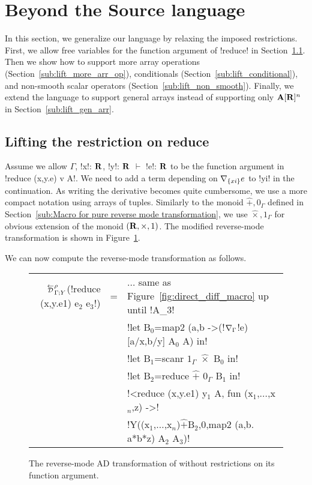 \section{Beyond the Source language}
\label{sec:generalization}
In this section, we generalize our language by relaxing the imposed restrictions.
First, we allow free variables for the function argument of !reduce! in Section~\ref{sub:lift_reduce}. 
Then we show how to support more array operations (Section~\ref{sub:lift_more_arr_op}), conditionals (Section~\ref{sub:lift_conditional}), and non-smooth scalar operators (Section~\ref{sub:lift_non_smooth}).
Finally, we extend the language to support general arrays instead of supporting only $\mathbf{A}[\mathbf{R}]^{n}$ in Section~\ref{sub:lift_gen_arr}.

\subsection{Lifting the restriction on reduce}
\label{sub:lift_reduce}

Assume we allow $\Gamma$, !x!: $\mathbf{R}$, !y!: $\mathbf{R}$ $\vdash$ !e!: $\mathbf{R}$ to be the function argument in
!reduce (x,y.e) v A!. We need to add a term depending on $\nabla_{\{xi\}}e$ to !yi! in the continuation.
As writing the derivative becomes quite cumbersome, we use a more compact notation using arrays of tuples. 
Similarly to the monoid $\widehat{+},0_\Gamma$ defined in Section~\ref{sub:Macro for pure reverse mode transformation},
we use $\widehat{\times},1_\Gamma$ for obvious extension of the monoid $(\mathbf{R},\times,1)$. The modified reverse-mode transformation is shown in Figure~\ref{fig:lift_reduce}.

We can now compute the reverse-mode transformation as follows.

\begin{figure}

\begin{small}
\begin{tabular}{|r c l|}
\hline
$\directD{\rho}{\Gamma}{Y}$(!reduce (x,y.e1) e$_2$ e$_3$!) 
&=& $\ldots$ same as Figure~\ref{fig:direct_diff_macro} up until !A_$3$! \\
&& !let B$_0$=map2 (a,b ->(!$\nabla_\Gamma$!e)[a/x,b/y] A$_0$ A) in!\\
&& !let B$_1$=scanr $1_\Gamma$ $\widehat{\times}$ B$_0$ in! \\
&& !let B$_2$=reduce $\widehat{+}$ $0_\Gamma$ B$_1$ in! \\
&& !<reduce (x,y.e1) y$_1$ A, fun (x$_1$,$\ldots$,x$_n$,z) ->! \\
&& !Y((x$_1$,$\ldots$,x$_n$)$\widehat{+}$B$_2$,0,map2 (a,b. a*b*z) A$_2$ A$_3$)! \\ \hline
\end{tabular}
\end{small}
\caption{The reverse-mode AD transformation of  without restrictions on its function argument.}
\label{fig:lift_reduce}
\end{figure}

